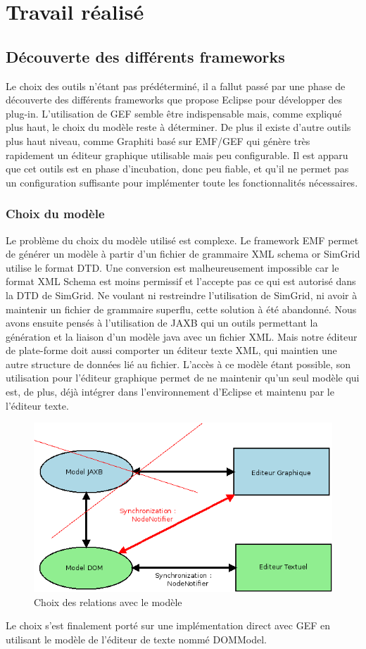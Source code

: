 \documentclass{article}
\begin{document}
\section{Travail réalisé}
    \subsection{Découverte des différents frameworks}
    	Le choix des outils n'étant pas prédéterminé, il a fallut passé par une phase de découverte des différents frameworks que propose Eclipse pour développer des plug-in. L'utilisation de GEF semble être indispensable mais, comme expliqué plus haut, le choix du modèle reste à déterminer. De plus il existe d'autre outils plus haut niveau, comme Graphiti basé sur EMF/GEF qui génère très rapidement un éditeur graphique utilisable mais peu configurable. Il est apparu que cet outils est en phase d'incubation, donc peu fiable, et qu'il ne permet pas un configuration suffisante pour implémenter toute les fonctionnalités nécessaires.
    \subsubsection{Choix du modèle}
    Le problème du choix du modèle utilisé est complexe. Le framework EMF permet de générer un modèle à partir d'un fichier de grammaire XML schema or SimGrid utilise le format DTD. Une conversion est malheureusement impossible car le format XML Schema est moins permissif et l'accepte pas ce qui est autorisé dans la DTD de SimGrid. Ne voulant ni restreindre l'utilisation de SimGrid, ni avoir à maintenir un fichier de grammaire superflu, cette solution à été abandonné.
    Nous avons ensuite pensés à l'utilisation de JAXB qui un outils permettant la génération et la liaison d'un modèle java avec un fichier XML. Mais notre éditeur de plate-forme doit aussi comporter un éditeur texte XML, qui maintien une autre structure de données lié au fichier. L'accès à ce modèle étant possible, son utilisation pour l'éditeur graphique permet de ne maintenir qu'un seul modèle qui est, de plus, déjà intégrer dans l'environnement d'Eclipse et maintenu par le l'éditeur texte.
    \begin{figure}[!h]
		  \centering
		  \includegraphics[scale=0.6]{img/modelSchema.png}
		  \caption{Choix des relations avec le modèle}
		\end{figure}
    Le choix s'est finalement porté sur une implémentation direct avec GEF en utilisant le modèle de l'éditeur de texte nommé DOMModel.
\end{document}
